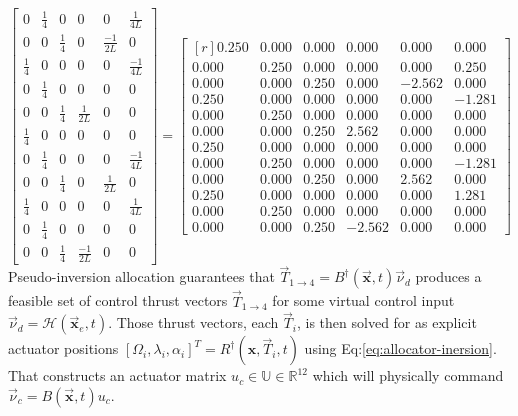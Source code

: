 \begin{subequations}
\begin{equation}
\begin{bmatrix}
0 & \frac{1}{4} & 0 & 0 & 0 & \frac{1}{4L}\\
0 & 0 & \frac{1}{4} & 0 & \frac{-1}{2L} & 0\\
\frac{1}{4} & 0 & 0 & 0 & 0 & \frac{-1}{4L}\\
0 & \frac{1}{4} & 0 & 0 & 0 & 0\\
0 & 0 & \frac{1}{4} & \frac{1}{2L} & 0 & 0\\
\frac{1}{4} & 0 & 0 & 0 & 0 & 0\\
0 & \frac{1}{4} & 0 & 0 & 0 & \frac{-1}{4L}\\
0 & 0 & \frac{1}{4} & 0 & \frac{1}{2L} & 0\\
\frac{1}{4} & 0 & 0 & 0 & 0 & \frac{1}{4L}\\
0 & \frac{1}{4} & 0 & 0 & 0 & 0\\
0 & 0 & \frac{1}{4} & \frac{-1}{2L} & 0 & 0
\end{bmatrix}
\end{equation}
\begin{equation}
=\begin{bmatrix*}[r]
0.250 & 0.000 & 0.000 & 0.000 & 0.000 & 0.000\\
0.000 & 0.250 & 0.000 & 0.000 & 0.000 & 0.250\\
0.000 & 0.000 & 0.250 & 0.000 & -2.562 & 0.000\\
0.250 & 0.000 & 0.000 & 0.000 & 0.000 & -1.281\\
0.000 & 0.250 & 0.000 & 0.000 & 0.000 & 0.000\\
0.000 & 0.000 & 0.250 & 2.562 & 0.000 & 0.000\\
0.250 & 0.000 & 0.000 & 0.000 & 0.000 & 0.000\\
0.000 & 0.250 & 0.000 & 0.000 & 0.000 & -1.281\\
0.000 & 0.000 & 0.250 & 0.000 & 2.562 & 0.000\\
0.250 & 0.000 & 0.000 & 0.000 & 0.000 & 1.281\\
0.000 & 0.250 & 0.000 & 0.000 & 0.000 & 0.000\\
0.000 & 0.000 & 0.250 & -2.562 & 0.000 & 0.000
\end{bmatrix*}
\end{equation}
\end{subequations}
Pseudo-inversion allocation guarantees that $\vec{T}_{1\rightarrow 4}=B^\dagger(\vec{\mathbf{x}},t)\vec{\nu}_d$ produces a feasible set of control thrust vectors $\vec{T}_{1\rightarrow 4}$ for some virtual control input $\vec{\nu}_d=\mathcal{H}(\vec{\mathbf{x}}_e,t)$.  Those thrust vectors, each $\vec{T}_{i}$, is then solved for as explicit actuator positions $[\Omega_i,\lambda_i,\alpha_i]^T=R^\dagger(\mathbf{x},\vec{T}_i,t)$ using Eq:\ref{eq:allocator-inersion}. That constructs an actuator matrix $u_c\in\mathbb{U}\in\mathbb{R}^{12}$ which will physically command $\vec{\nu}_c=B(\vec{\mathbf{x}},t)u_c$. 
